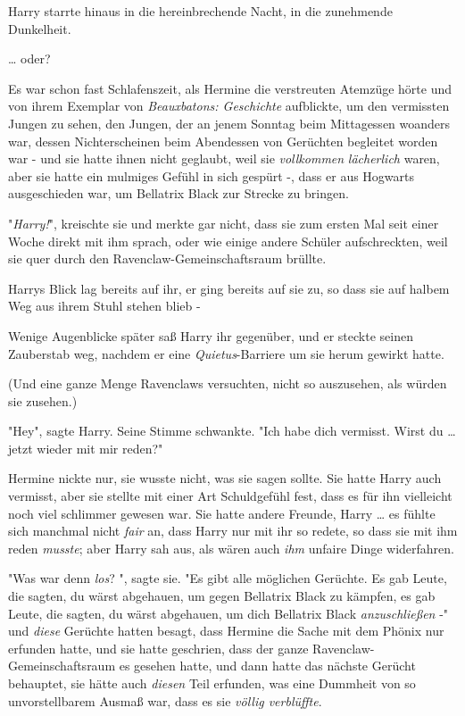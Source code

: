 {Harry starrte hinaus in die hereinbrechende Nacht, in die zunehmende Dunkelheit.

… oder?

Es war schon fast Schlafenszeit, als Hermine die verstreuten Atemzüge hörte und von ihrem Exemplar von \emph{Beauxbatons: Geschichte} aufblickte, um den vermissten Jungen zu sehen, den Jungen, der an jenem Sonntag beim Mittagessen woanders war, dessen Nichterscheinen beim Abendessen von Gerüchten begleitet worden war - und sie hatte ihnen nicht geglaubt, weil sie \emph{vollkommen} \emph{lächerlich} waren, aber sie hatte ein mulmiges Gefühl in sich gespürt -, dass er aus Hogwarts ausgeschieden war, um Bellatrix Black zur Strecke zu bringen.

"\emph{Harry!}", kreischte sie und merkte gar nicht, dass sie zum ersten Mal seit einer Woche direkt mit ihm sprach, oder wie einige andere Schüler aufschreckten, weil sie quer durch den Ravenclaw-Gemeinschaftsraum brüllte.

Harrys Blick lag bereits auf ihr, er ging bereits auf sie zu, so dass sie auf halbem Weg aus ihrem Stuhl stehen blieb -

Wenige Augenblicke später saß Harry ihr gegenüber, und er steckte seinen Zauberstab weg, nachdem er eine \emph{Quietus}-Barriere um sie herum gewirkt hatte.

(Und eine ganze Menge Ravenclaws versuchten, nicht so auszusehen, als würden sie zusehen.)

"Hey", sagte Harry. Seine Stimme schwankte. "Ich habe dich vermisst. Wirst du … jetzt wieder mit mir reden?"

Hermine nickte nur, sie wusste nicht, was sie sagen sollte. Sie hatte Harry auch vermisst, aber sie stellte mit einer Art Schuldgefühl fest, dass es für ihn vielleicht noch viel schlimmer gewesen war. Sie hatte andere Freunde, Harry … es fühlte sich manchmal nicht \emph{fair} an, dass Harry nur mit ihr so redete, so dass sie mit ihm reden \emph{musste}; aber Harry sah aus, als wären auch \emph{ihm} unfaire Dinge widerfahren.

"Was war denn \emph{los}? ", sagte sie. "Es gibt alle möglichen Gerüchte. Es gab Leute, die sagten, du wärst abgehauen, um gegen Bellatrix Black zu kämpfen, es gab Leute, die sagten, du wärst abgehauen, um dich Bellatrix Black \emph{anzuschließen} -" und \emph{diese} Gerüchte hatten besagt, dass Hermine die Sache mit dem Phönix nur erfunden hatte, und sie hatte geschrien, dass der ganze Ravenclaw-Gemeinschaftsraum es gesehen hatte, und dann hatte das nächste Gerücht behauptet, sie hätte auch \emph{diesen} Teil erfunden, was eine Dummheit von so unvorstellbarem Ausmaß war, dass es sie \emph{völlig verblüffte}.

}
